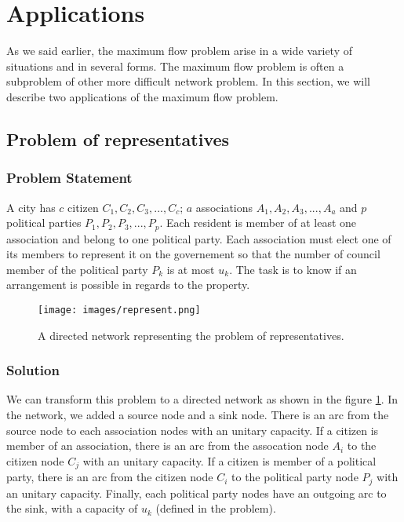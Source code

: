 \section{Applications}
\label{sec:applications}
As we said earlier, the maximum flow problem arise in a wide variety of situations and in several forms. The maximum flow problem is often a subproblem of other more difficult network problem. In this section, we will describe two applications of the maximum flow problem.

\subsection{Problem of representatives}

\subsubsection{Problem Statement}

A city has $c$ citizen $C_1, C_2, C_3, ..., C_c$; $a$ associations $A_1, A_2, A_3, ..., A_a$ and $p$ political parties $P_1, P_2, P_3, ..., P_p$. Each resident is member of at least one association and belong to one political party. Each association  must elect one of its members to represent it on the governement so that the number of council member of the political party $P_k$ is at most $u_k$. The task is to know if an arrangement is possible in regards to the property.

\begin{figure}[H]
\centering
\texttt{[image: images/represent.png]}
\caption{A directed network representing the problem of representatives.}
\label{img:represent}
\end{figure}

\subsubsection{Solution}

We can transform this problem to a directed network as shown in the figure \ref{img:represent}. In the network, we added a source node and a sink node. There is an arc from the source node to each association nodes with an unitary capacity. If a citizen is member of an association, there is an arc from the assocation node $A_i$ to the citizen node $C_j$ with an unitary capacity. If a citizen is member of a political party, there is an arc from the citizen node $C_i$ to the political party node $P_j$ with an unitary capacity. Finally, each political party nodes have an outgoing arc to the sink, with a capacity of $u_k$ (defined in the problem).


